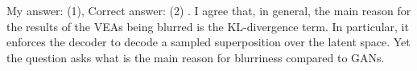 \documentclass{article}
\newcommand{\inb}[1]{ \color{blue}#1 \color{black} }
\begin{document}
\inb{ My answer: (1), Correct answer: (2)}. 
%
%
%
%
%
%
%
I agree that, in general, the main reason for the results of the VEAs being blurred is the KL-divergence term. In particular, it enforces the decoder to decode a sampled superposition over the latent space. Yet the question asks what is the main reason for blurriness compared to GANs.
\end{document}
